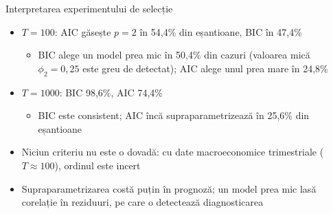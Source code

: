\begin{frame}{Interpretarea experimentului de selecție}
\itemsize{\small}
\begin{itemize}
    \item $T = 100$: AIC găsește $p = 2$ în 54{,}4\% din eșantioane, BIC în 47{,}4\%
    \begin{itemize}
        \item BIC alege un model prea mic în 50{,}4\% din cazuri (valoarea mică $\phi_2 = 0{,}25$ este greu de detectat); AIC alege unul prea mare în 24{,}8\%
    \end{itemize}
    \item $T = 1000$: BIC 98{,}6\%, AIC 74{,}4\%
    \begin{itemize}
        \item BIC este consistent; AIC încă supraparametrizează în 25{,}6\% din eșantioane
    \end{itemize}
    \item Niciun criteriu nu este o dovadă: cu date macroeconomice trimestriale ($T \approx 100$), ordinul este incert
    \item Supraparametrizarea costă puțin în prognoză; un model prea mic lasă corelație în reziduuri, pe care o detectează diagnosticarea
\end{itemize}
\end{frame}

